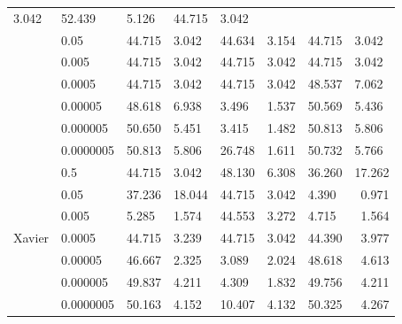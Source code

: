 \begin{table}[H]
\begin{tabular}{cl|llllll|}
    \multicolumn{1}{l|}{3.042} &
    52.439 &
    \multicolumn{1}{l|}{5.126} &
    44.715 &
    3.042 \\
\multicolumn{1}{|c|}{} &
    0.05 &
    44.715 &
    \multicolumn{1}{l|}{3.042} &
    44.634 &
    \multicolumn{1}{l|}{3.154} &
    44.715 &
    3.042 \\
\multicolumn{1}{|c|}{} &
    0.005 &
    44.715 &
    \multicolumn{1}{l|}{3.042} &
    44.715 &
    \multicolumn{1}{l|}{3.042} &
    44.715 &
    3.042 \\
\multicolumn{1}{|c|}{} &
    0.0005 &
    44.715 &
    \multicolumn{1}{l|}{3.042} &
    44.715 &
    \multicolumn{1}{l|}{3.042} &
    48.537 &
    7.062 \\
\multicolumn{1}{|c|}{} &
    0.00005 &
    48.618 &
    \multicolumn{1}{l|}{6.938} &
    3.496 &
    \multicolumn{1}{l|}{1.537} &
    50.569 &
    5.436 \\
\multicolumn{1}{|c|}{} &
    0.000005 &
    50.650 &
    \multicolumn{1}{l|}{5.451} &
    3.415 &
    \multicolumn{1}{l|}{1.482} &
    50.813 &
    5.806 \\
\multicolumn{1}{|c|}{} &
    0.0000005 &
    50.813 &
    \multicolumn{1}{l|}{5.806} &
    26.748 &
    \multicolumn{1}{l|}{1.611} &
    50.732 &
    5.766 \\ \hline
\multicolumn{1}{|c|}{\multirow{7}{*}{Xavier}} &
    0.5 &
    44.715 &
    \multicolumn{1}{l|}{3.042} &
    48.130 &
    \multicolumn{1}{l|}{6.308} &
    36.260 &
    \multicolumn{1}{r|}{17.262} \\
\multicolumn{1}{|c|}{} &
    0.05 &
    37.236 &
    \multicolumn{1}{l|}{18.044} &
    44.715 &
    \multicolumn{1}{l|}{3.042} &
    4.390 &
    \multicolumn{1}{r|}{0.971} \\
\multicolumn{1}{|c|}{} &
    0.005 &
    5.285 &
    \multicolumn{1}{l|}{1.574} &
    44.553 &
    \multicolumn{1}{l|}{3.272} &
    4.715 &
    \multicolumn{1}{r|}{1.564} \\
\multicolumn{1}{|c|}{} &
    0.0005 &
    44.715 &
    \multicolumn{1}{l|}{3.239} &
    44.715 &
    \multicolumn{1}{r|}{3.042} &
    44.390 &
    \multicolumn{1}{r|}{3.977} \\
\multicolumn{1}{|c|}{} &
    0.00005 &
    46.667 &
    \multicolumn{1}{l|}{2.325} &
    3.089 &
    \multicolumn{1}{r|}{2.024} &
    48.618 &
    \multicolumn{1}{r|}{4.613} \\
\multicolumn{1}{|c|}{} &
    0.000005 &
    49.837 &
    \multicolumn{1}{l|}{4.211} &
    4.309 &
    \multicolumn{1}{l|}{1.832} &
    49.756 &
    \multicolumn{1}{r|}{4.211} \\
\multicolumn{1}{|c|}{} &
    0.0000005 &
    50.163 &
    \multicolumn{1}{l|}{4.152} &
    10.407 &
    \multicolumn{1}{l|}{4.132} &
    50.325 &
    \multicolumn{1}{r|}{4.267} \\ \hline
\end{tabular}
\label{table:vggconhard}
\end{table}

